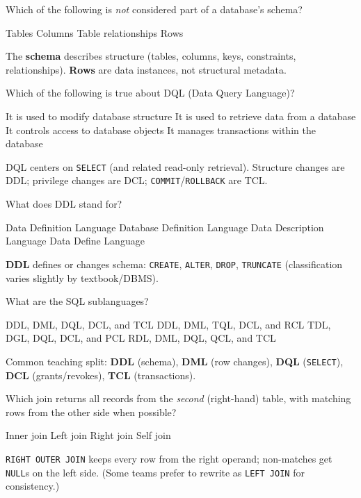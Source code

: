 \question[4]
Which of the following is \emph{not} considered part of a database's schema?
\begin{choices}
  \choice Tables
  \choice Columns
  \choice Table relationships
  \CorrectChoice Rows
\end{choices}
\begin{solution}
  The \textbf{schema} describes structure (tables, columns, keys, constraints, relationships). \textbf{Rows} are data instances, not structural metadata.
\end{solution}

\question[4]
Which of the following is true about DQL (Data Query Language)?
\begin{choices}
  \choice It is used to modify database structure
  \CorrectChoice It is used to retrieve data from a database
  \choice It controls access to database objects
  \choice It manages transactions within the database
\end{choices}
\begin{solution}
  DQL centers on \texttt{SELECT} (and related read-only retrieval). Structure changes are DDL; privilege changes are DCL; \texttt{COMMIT}/\texttt{ROLLBACK} are TCL.
\end{solution}

\question[4]
What does DDL stand for?
\begin{choices}
  \CorrectChoice Data Definition Language
  \choice Database Definition Language
  \choice Data Description Language
  \choice Data Define Language
\end{choices}
\begin{solution}
  \textbf{DDL} defines or changes schema: \texttt{CREATE}, \texttt{ALTER}, \texttt{DROP}, \texttt{TRUNCATE} (classification varies slightly by textbook/DBMS).
\end{solution}

\question[4]
What are the SQL sublanguages?
\begin{choices}
  \CorrectChoice DDL, DML, DQL, DCL, and TCL
  \choice DDL, DML, TQL, DCL, and RCL
  \choice TDL, DGL, DQL, DCL, and PCL
  \choice RDL, DML, DQL, QCL, and TCL
\end{choices}
\begin{solution}
  Common teaching split: \textbf{DDL} (schema), \textbf{DML} (row changes), \textbf{DQL} (\texttt{SELECT}), \textbf{DCL} (grants/revokes), \textbf{TCL} (transactions).
\end{solution}

\question[4]
Which join returns all records from the \emph{second} (right-hand) table, with matching rows from the other side when possible?
\begin{choices}
  \choice Inner join
  \choice Left join
  \CorrectChoice Right join
  \choice Self join
\end{choices}
\begin{solution}
  \texttt{RIGHT OUTER JOIN} keeps every row from the right operand; non-matches get \texttt{NULL}s on the left side. (Some teams prefer to rewrite as \texttt{LEFT JOIN} for consistency.)
\end{solution}

